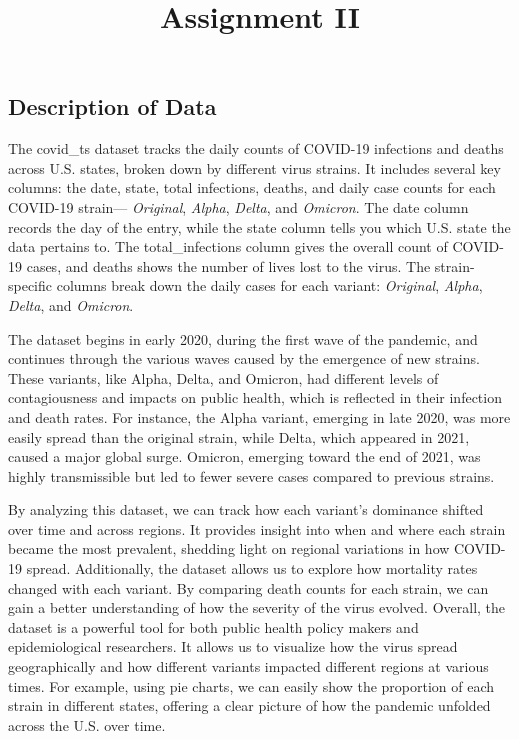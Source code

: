 \documentclass[
]{article}
\title{Assignment II}
\author{}
\date{}
\begin{document}
\maketitle


\subsection{Description of Data}\label{description-of-data}

The covid\_ts dataset tracks the daily counts of COVID-19 infections and
deaths across U.S. states, broken down by different virus strains. It
includes several key columns: the date, state, total infections, deaths,
and daily case counts for each COVID-19 strain--- \emph{Original},
\emph{Alpha}, \emph{Delta}, and \emph{Omicron}. The date column records
the day of the entry, while the state column tells you which U.S. state
the data pertains to. The total\_infections column gives the overall
count of COVID-19 cases, and deaths shows the number of lives lost to
the virus. The strain-specific columns break down the daily cases for
each variant: \emph{Original}, \emph{Alpha}, \emph{Delta}, and
\emph{Omicron}.

The dataset begins in early 2020, during the first wave of the pandemic,
and continues through the various waves caused by the emergence of new
strains. These variants, like Alpha, Delta, and Omicron, had different
levels of contagiousness and impacts on public health, which is
reflected in their infection and death rates. For instance, the Alpha
variant, emerging in late 2020, was more easily spread than the original
strain, while Delta, which appeared in 2021, caused a major global
surge. Omicron, emerging toward the end of 2021, was highly
transmissible but led to fewer severe cases compared to previous
strains.

By analyzing this dataset, we can track how each variant's dominance
shifted over time and across regions. It provides insight into when and
where each strain became the most prevalent, shedding light on regional
variations in how COVID-19 spread. Additionally, the dataset allows us
to explore how mortality rates changed with each variant. By comparing
death counts for each strain, we can gain a better understanding of how
the severity of the virus evolved. Overall, the dataset is a powerful
tool for both public health policy makers and epidemiological
researchers. It allows us to visualize how the virus spread
geographically and how different variants impacted different regions at
various times. For example, using pie charts, we can easily show the
proportion of each strain in different states, offering a clear picture
of how the pandemic unfolded across the U.S. over time.
\end{document}
